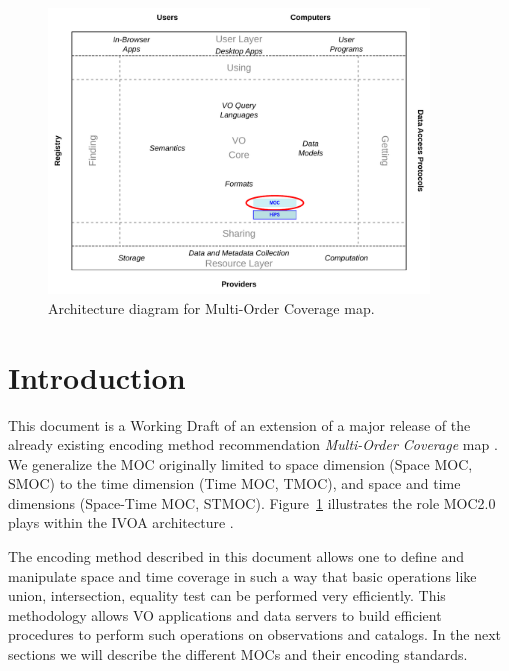 \documentclass[11pt,a4paper]{ivoa}
\begin{document}
\begin{figure}[!htbp]
\begin{center}
\includegraphics[width=0.9\textwidth]{role_diagram.pdf}
\end{center}
\caption[IVOA architecture diagram]{Architecture diagram for Multi-Order Coverage map.}
\label{fig:ivoadiagram}
\end{figure}

\section{Introduction}
This document is a Working Draft of an extension of a major release of
the already existing encoding method recommendation \emph{Multi-Order
  Coverage} map \citep[MOC~1.1,][]{2019ivoa.spec.1007F}. We generalize the MOC
originally limited to space dimension (Space MOC, SMOC) to the time
dimension (Time MOC, TMOC), and space and time dimensions (Space-Time
MOC, STMOC). Figure~\ref{fig:ivoadiagram} illustrates the role MOC2.0
plays within the IVOA architecture \citep{note:VOARCH}.

The encoding method described in this document allows one to define
and manipulate space and time coverage in such a way that basic
operations like union, intersection, equality test can be performed
very efficiently. This methodology allows VO applications and
data servers to build efficient
procedures to perform such operations on observations and catalogs. 
In the next sections we will describe the different MOCs and their
encoding standards.
\end{document}
